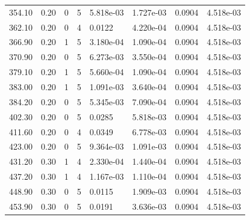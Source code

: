 \documentclass[preview]{standalone}
\begin{document}
{{{\begin{tabular}{L{1.2cm}C{1.2cm} C{0.3cm}C{0.5cm} C{1.4cm}C{1.4cm} C{1.4cm}C{1.4cm}}
  354.10  &  0.20  & 0     &  5 &  5.818e-03  & 1.727e-03  & 0.0904 &  4.518e-03   \\ 
  362.10  &  0.20  & 0     &  4 &  0.0122  & 4.220e-04  & 0.0904 &  4.518e-03   \\ 
  366.90  &  0.20  & 1     &  5 &  3.180e-04  & 1.090e-04  & 0.0904 &  4.518e-03   \\ 
  370.90  &  0.20  & 0     &  5 &  6.273e-03  & 3.550e-04  & 0.0904 &  4.518e-03   \\ 
  379.10  &  0.20  & 1     &  5 &  5.660e-04  & 1.090e-04  & 0.0904 &  4.518e-03   \\ 
  383.00  &  0.20  & 1     &  5 &  1.091e-03  & 3.640e-04  & 0.0904 &  4.518e-03   \\ 
  384.20  &  0.20  & 0     &  5 &  5.345e-03  & 7.090e-04  & 0.0904 &  4.518e-03   \\ 
  402.30  &  0.20  & 0     &  5 &  0.0285  & 5.818e-03  & 0.0904 &  4.518e-03   \\ 
  411.60  &  0.20  & 0     &  4 &  0.0349  & 6.778e-03  & 0.0904 &  4.518e-03   \\ 
  423.00  &  0.20  & 0     &  5 &  9.364e-03  & 1.091e-03  & 0.0904 &  4.518e-03   \\ 
  431.20  &  0.30  & 1     &  4 &  2.330e-04  & 1.440e-04  & 0.0904 &  4.518e-03   \\ 
  437.20  &  0.30  & 1     &  4 &  1.167e-03  & 1.110e-04  & 0.0904 &  4.518e-03   \\ 
  448.90  &  0.30  & 0     &  5 &  0.0115  & 1.909e-03  & 0.0904 &  4.518e-03   \\ 
  453.90  &  0.30  & 0     &  5 &  0.0191  & 3.636e-03  & 0.0904 &  4.518e-03   \\ 
\hline 
\end{tabular} 

}}}
\end{document}
